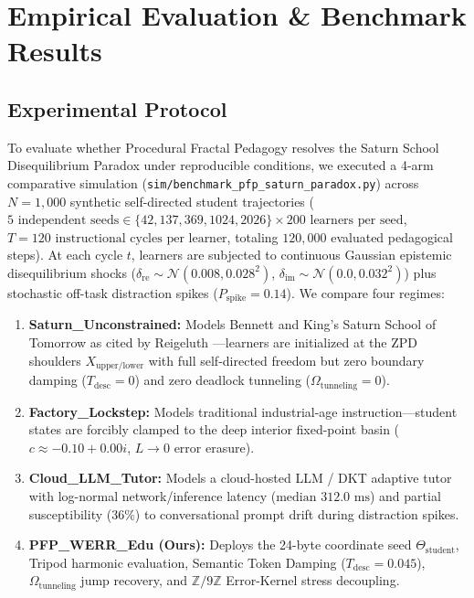 \documentclass[10pt,twocolumn,a4paper]{article}
\begin{document}
\section{Empirical Evaluation \& Benchmark Results}

\subsection{Experimental Protocol}
To evaluate whether Procedural Fractal Pedagogy resolves the Saturn School Disequilibrium Paradox under reproducible conditions, we executed a 4-arm comparative simulation (\texttt{sim/benchmark\_pfp\_saturn\_paradox.py}) across $N = 1,000$ synthetic self-directed student trajectories ($5\text{ independent seeds} \in \{42, 137, 369, 1024, 2026\} \times 200\text{ learners per seed}$, $T = 120\text{ instructional cycles per learner}$, totaling $120,000$ evaluated pedagogical steps). At each cycle $t$, learners are subjected to continuous Gaussian epistemic disequilibrium shocks ($\delta_{\text{re}} \sim \mathcal{N}(0.008, 0.028^2)$, $\delta_{\text{im}} \sim \mathcal{N}(0.0, 0.032^2)$) plus stochastic off-task distraction spikes ($P_{\text{spike}} = 0.14$). We compare four regimes:
\begin{enumerate}[leftmargin=*,nosep]
    \item \textbf{Saturn\_Unconstrained:} Models Bennett and King's \cite{bennett1991saturn} Saturn School of Tomorrow as cited by Reigeluth \cite[p.~34]{reigeluth2008chaos}---learners are initialized at the ZPD shoulders $X_{\text{upper/lower}}$ with full self-directed freedom but zero boundary damping ($T_{\text{desc}} = 0$) and zero deadlock tunneling ($\Omega_{\text{tunneling}} = 0$).
    \item \textbf{Factory\_Lockstep:} Models traditional industrial-age instruction---student states are forcibly clamped to the deep interior fixed-point basin ($c \approx -0.10 + 0.00i$, $L \to 0$ error erasure).
    \item \textbf{Cloud\_LLM\_Tutor:} Models a cloud-hosted LLM / DKT adaptive tutor with log-normal network/inference latency ($\text{median } 312.0\text{ ms}$) and partial susceptibility ($36\%$) to conversational prompt drift during distraction spikes.
    \item \textbf{PFP\_WERR\_Edu (Ours):} Deploys the 24-byte coordinate seed $\Theta_{\text{student}}$, Tripod harmonic evaluation, Semantic Token Damping ($T_{\text{desc}} = 0.045$), $\Omega_{\text{tunneling}}$ jump recovery, and $\mathbb{Z}/9\mathbb{Z}$ Error-Kernel stress decoupling.
\end{enumerate}
\end{document}
